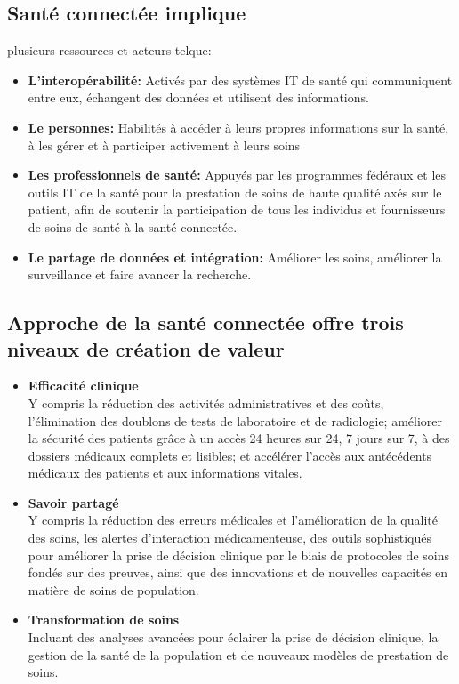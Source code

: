 \documentclass[12pt]{article}
\begin{document}
\subsection{Santé connectée implique} 
plusieurs ressources et acteurs telque:
\begin{itemize}
	\item \textbf{L’interopérabilité:} Activés par des systèmes IT de santé qui communiquent entre eux, échangent des données et utilisent des informations.
	\item \textbf{Le personnes:} Habilités à accéder à leurs propres informations sur la santé, à les gérer et à participer activement à leurs soins
	\item \textbf{Les professionnels de santé:} Appuyés par les programmes fédéraux et les outils IT de la santé pour la prestation de soins de haute qualité axés sur le patient, afin de soutenir la participation de tous les individus et fournisseurs de soins de santé à la santé connectée.
	\item \textbf{Le partage de données et intégration:} Améliorer les soins, améliorer la surveillance et faire avancer la recherche.
\end{itemize}

\subsection{Approche de la santé connectée offre trois niveaux de création de valeur}
\begin{itemize}
	\item \textbf{Efficacité clinique}\\
	Y compris la réduction des activités administratives et des coûts, l’élimination des doublons de tests de laboratoire et de radiologie; améliorer la sécurité des patients grâce à un accès 24 heures sur 24, 7 jours sur 7, à des dossiers médicaux complets et lisibles; et accélérer l'accès aux antécédents médicaux des patients et aux informations vitales.
	\item \textbf{Savoir partagé}\\
	Y compris la réduction des erreurs médicales et l'amélioration de la qualité des soins, les alertes d'interaction médicamenteuse, des outils sophistiqués pour améliorer la prise de décision clinique par le biais de protocoles de soins fondés sur des preuves, ainsi que des innovations et de nouvelles capacités en matière de soins de population.
	\item \textbf{Transformation de soins}\\
	Incluant des analyses avancées pour éclairer la prise de décision clinique, la gestion de la santé de la population et de nouveaux modèles de prestation de soins.
\end{itemize}
\newpage
\end{document}
